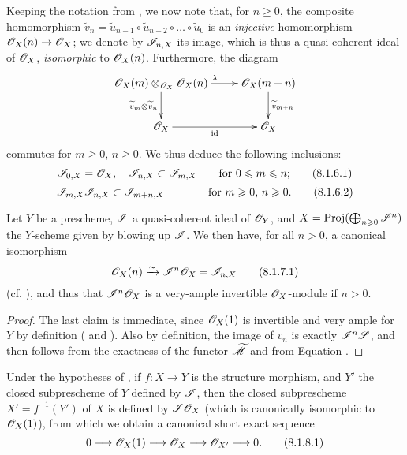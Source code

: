 \begin{env}[8.1.6]
\label{2.8.1.6}
Keeping the notation from , we now note that, for $n\geq0$, the composite homomorphism $\widetilde{v}_n = \widetilde{u}_{n-1} \circ \widetilde{u}_{n-2} \circ \ldots \circ \widetilde{u}_0$ is an \emph{injective} homomorphism $\sh{O}_X(n) \to \sh{O}_X$;
we denote by $\mathscr{I}_{n,X}$ its image, which is thus a quasi-coherent ideal of $\mathscr{O}_X$, \emph{isomorphic} to $\mathscr{O}_X(n)$.
Furthermore, the diagram
\[
  \xymatrix{
    \sh{O}_X(m) \otimes_{\sh{O}_X} \sh{O}_X(n)
      \ar[r]^{\lambda}
      \ar[d]_{\widetilde{v}_m \otimes \widetilde{v}_n}
  & \sh{O}_X(m+n)
      \ar[d]^{\widetilde{v}_{m+n}}
  \\\sh{O}_X
      \ar[r]_{\id}
  & \sh{O}_X
  }
\]
commutes for $m\geq0$, $n\geq0$.
We thus deduce the following inclusions:
\[
\label{eq:2.8.1.6.1}
  \mathscr{I}_{0,X} = \mathscr{O}_X, \quad \mathscr{I}_{n,X} \subset \mathscr{I}_{m,X}
  \qquad\mbox{for $0\leqslant m\leqslant n$;}
\tag{8.1.6.1}
\]
\[
\label{eq:2.8.1.6.2}
  \mathscr{I}_{m,X}\mathscr{I}_{n,X} \subset \mathscr{I}_{m+n,X}
  \qquad\qquad\mbox{for $m\geqslant0$, $n\geqslant0$.}
\tag{8.1.6.2}
\]
\end{env}


\begin{proposition}[8.1.7]
\label{2.8.1.7}
Let $Y$ be a prescheme, $\mathscr{I}$ a quasi-coherent ideal of $\mathscr{O}_Y$, and $X = \operatorname{Proj}(\bigoplus_{n\geqslant0}\mathscr{I}^n)$ the $Y$-scheme given by blowing up $\mathscr{I}$.
We then have, for all $n>0$, a canonical isomorphism
\[
\label{eq:2.8.1.7.1}
  \mathscr{O}_X(n) \xrightarrow{\sim} \mathscr{I}^n\mathscr{O}_X = \mathscr{I}_{n,X}
\tag{8.1.7.1}
\]
(cf. ), and thus that $\mathscr{I}^n\mathscr{O}_X$ is a very-ample invertible $\mathscr{O}_X$-module if $n>0$.
\end{proposition}

\begin{proof}
\label{proof-2.8.1.7}
The last claim is immediate, since $\mathscr{O}_X(1)$ is invertible  and very ample for $Y$ by definition ( and ).
Also by definition, the image of $v_n$ is exactly $\mathscr{I}^n\mathscr{S}$, and  then follows from the exactness of the functor $\widetilde{\mathscr{M}}$  and from Equation .
\end{proof}

\begin{corollary}[8.1.8]
\label{2.8.1.8}
Under the hypotheses of , if $f:X\to Y$ is the structure morphism, and $Y'$ the closed subprescheme of $Y$ defined by $\mathscr{I}$, then the closed subprescheme $X' = f^{-1}(Y')$ of $X$ is defined by $\mathscr{I}\mathscr{O}_X$ (which is canonically isomorphic to $\mathscr{O}_X(1)$), from which we obtain a canonical short exact sequence
\[
\label{eq:2.8.1.8.1}
  0 \to \sh{O}_X(1) \to \sh{O}_X \to \sh{O}_{X'} \to 0.
\tag{8.1.8.1}
\]
\end{corollary}

